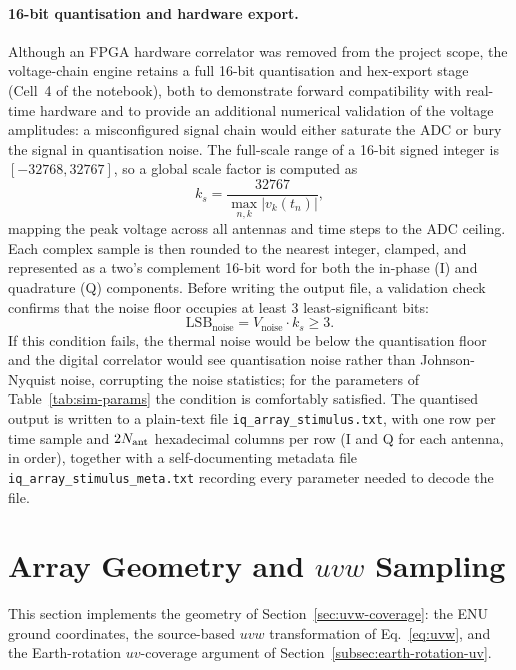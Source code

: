 \paragraph{16-bit quantisation and hardware export.} Although an FPGA
hardware correlator was removed from the project scope, the voltage-chain
engine retains a full 16-bit quantisation and hex-export stage (Cell~4 of the
notebook), both to demonstrate forward compatibility with real-time hardware
and to provide an additional numerical validation of the voltage amplitudes:
a misconfigured signal chain would either saturate the ADC or bury the
signal in quantisation noise. The full-scale range of a 16-bit signed
integer is $[-32768, 32767]$, so a global scale factor is computed as
\begin{equation}
  k_s = \frac{32767}{\max_{n,k}|v_k(t_n)|},
  \label{eq:scale}
\end{equation}
mapping the peak voltage across all antennas and time steps to the ADC
ceiling. Each complex sample is then rounded to the nearest integer, clamped,
and represented as a two's complement 16-bit word for both the in-phase (I)
and quadrature (Q) components. Before writing the output file, a validation
check confirms that the noise floor occupies at least 3 least-significant
bits:
\begin{equation}
  \mathrm{LSB}_{\mathrm{noise}} = V_{\mathrm{noise}}\cdot k_s \geq 3.
  \label{eq:lsb-check}
\end{equation}
If this condition fails, the thermal noise would be below the quantisation
floor and the digital correlator would see quantisation noise rather than
Johnson-Nyquist noise, corrupting the noise statistics; for the parameters of
Table~\ref{tab:sim-params} the condition is comfortably satisfied. The
quantised output is written to a plain-text file
\texttt{iq\_array\_stimulus.txt}, with one row per time sample and
$2N_{\rm ant}$ hexadecimal columns per row (I and Q for each antenna, in
order), together with a self-documenting metadata file
\texttt{iq\_array\_stimulus\_meta.txt} recording every parameter needed to
decode the file.

\section{Array Geometry and \texorpdfstring{$uvw$}{uvw} Sampling}
\label{sec:geometry}

This section implements the geometry of Section~\ref{sec:uvw-coverage}: the
ENU ground coordinates, the source-based $uvw$ transformation of
Eq.~\eqref{eq:uvw}, and the Earth-rotation $uv$-coverage argument of
Section~\ref{subsec:earth-rotation-uv}.

